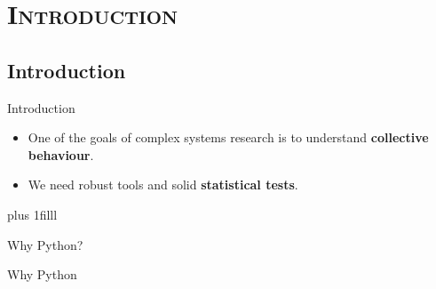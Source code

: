 \documentclass[xcolor=x11names, compress]{beamer}
\renewcommand{\(}{\begin{columns}}
\renewcommand{\)}{\end{columns}}
\newcommand{\<}[1]{\begin{column}{#1}}
\renewcommand{\>}{\end{column}}
\newcommand{\btVFill}{\vskip0pt plus 1filll}
\begin{document}
\section{ \scshape Introduction}
\subsection{Introduction}
\begin{frame}{Introduction}
  \bigskip

  \begin{itemize}
    
    \item One of the goals of complex systems research is to understand
    \textbf{collective behaviour}.

    \vfill
    \pause
    \item We need robust tools and solid \textbf{statistical tests}.

  \end{itemize}


  \btVFill


\end{frame}


\begin{frame}{Why Python?}

  Why Python

\end{frame}
\end{document}
